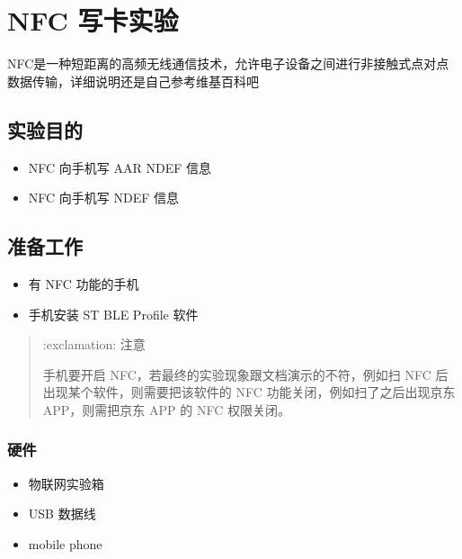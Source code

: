 \documentclass[a4paper,12pt,english]{sphinxmanual}
\begin{document}
\section{NFC 写卡实验}
\label{\detokenize{exp-stm32/nfc:nfc}}\label{\detokenize{exp-stm32/nfc::doc}}
\sphinxAtStartPar
NFC是一种短距离的高频无线通信技术，允许电子设备之间进行非接触式点对点数据传输，详细说明还是自己参考维基百科吧


\subsection{实验目的}
\label{\detokenize{exp-stm32/nfc:id1}}\begin{itemize}
\item {} 
\sphinxAtStartPar
NFC 向手机写 AAR NDEF 信息

\item {} 
\sphinxAtStartPar
NFC 向手机写 NDEF 信息

\end{itemize}


\subsection{准备工作}
\label{\detokenize{exp-stm32/nfc:id2}}\begin{itemize}
\item {} 
\sphinxAtStartPar
有 NFC 功能的手机

\item {} 
\sphinxAtStartPar
手机安装 ST BLE Profile 软件

\end{itemize}
\begin{quote}

\sphinxAtStartPar
:exclamation: 注意

\sphinxAtStartPar
手机要开启 NFC，若最终的实验现象跟文档演示的不符，例如扫 NFC 后出现某个软件，则需要把该软件的 NFC 功能关闭，例如扫了之后出现京东 APP，则需把京东 APP 的 NFC 权限关闭。
\end{quote}


\subsubsection{硬件}
\label{\detokenize{exp-stm32/nfc:id3}}\begin{itemize}
\item {} 
\sphinxAtStartPar
物联网实验箱

\item {} 
\sphinxAtStartPar
USB 数据线

\item {} 
\sphinxAtStartPar
mobile phone

\end{itemize}
\end{document}

